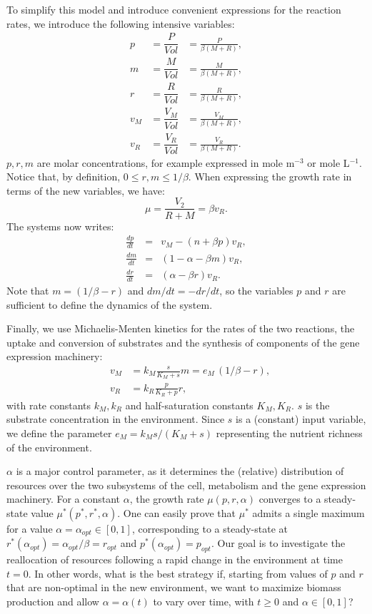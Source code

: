 \documentclass[a4paper, 10pt, conference]{ieeeconf}      %
\begin{document}
To simplify this model and introduce convenient expressions for the reaction rates, we introduce the following intensive variables:
\begin{eqnarray*}
p &= \dfrac{P}{\mathit{Vol}} &= \frac{P}{\beta (M+R)}, \\
m &= \dfrac{M}{\mathit{Vol}} &= \frac{M}{\beta (M+R)},\\
r &= \dfrac{R}{\mathit{Vol}} &= \frac{R}{\beta (M+R)},\\
v_M &= \dfrac{V_M}{\mathit{Vol}} &= \frac{V_M}{\beta (M+R)},\\
v_R &= \dfrac{V_R}{\mathit{Vol}} &= \frac{V_R}{\beta (M+R)}.
\end{eqnarray*}
$p,r,m$ are molar concentrations, for example expressed in mole m$^{-3}$ or mole L$^{-1}$.
Notice that, by definition, $0 \leq r, m \leq 1/\beta$.
When expressing the growth rate in terms of the new variables, we have:
\[
\mu = \frac{V_2}{R+M} = \beta v_R.
\]
The systems now writes:
\begin{eqnarray}
\frac{dp}{dt} &=& v_M - (n + \beta p) v_R, \label{eq:p} \\
\frac{dm}{dt} &=& (1-\alpha - \beta m) v_R, \label{eq:m} \\ 
\frac{dr}{dt} &=& (\alpha - \beta r) v_R. \label{eq:r}
\end{eqnarray}
Note that $m = (1/\beta - r)$ and $dm/dt = - dr/dt$, so the variables $p$ and $r$ are sufficient to define the dynamics of the system.

Finally, we use Michaelis-Menten kinetics for the rates of the two reactions, the uptake and conversion of substrates and the synthesis of components of the gene expression machinery:
\begin{eqnarray}
&v_M &= k_M \frac{s}{K_M +s} m = e_M \, (1/\beta -r), \\
&v_R &= k_R \frac{p}{K_R + p} r,
\end{eqnarray}
with rate constants $k_M, k_R$ and half-saturation constants $K_M, K_R$.
$s$ is the substrate concentration in the environment.
Since $s$ is a (constant) input variable, we define the parameter $e_M = k_M s / (K_M + s)$ representing the nutrient richness of the environment.

$\alpha$ is a major control parameter, as it determines the (relative) distribution of resources over the two subsystems of the cell, metabolism and the gene expression machinery.
For a constant $\alpha$, the growth rate $\mu(p,r,\alpha)$ converges to a steady-state value $\mu^*(p^*, r^*, \alpha)$. 
One can easily prove that $\mu^*$ admits a single maximum for a value $\alpha = \alpha_{opt} \in [0,1]$, corresponding to a steady-state at $r^* (\alpha_{opt}) = \alpha_{opt}/ \beta = r_{opt}$ and $p^* (\alpha_{opt}) = p_{opt}$.
Our goal is to investigate the reallocation of resources following a rapid change in the environment at time $t=0$.
In other words, what is the best strategy if, starting from values of $p$ and $r$ that are non-optimal in the new environment, we want to maximize biomass production and allow $\alpha = \alpha(t)$ to vary over time, with $t\geq 0$ and $\alpha \in [0, 1]$?
\end{document}
